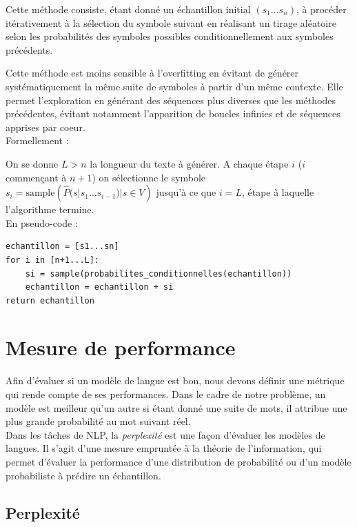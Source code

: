 Cette méthode consiste, étant donné un échantillon initial $(s_1\ldots s_n)$, à procéder itérativement à la sélection du symbole suivant en réalisant un tirage aléatoire selon les probabilités des symboles possibles conditionnellement aux symboles précédents.

Cette méthode est moins sensible à l'overfitting en évitant de générer systématiquement la même suite de symboles à partir d'un même contexte. Elle permet l'exploration en générant des séquences plus diverses que les méthodes précédentes, évitant notamment l'apparition de boucles infinies et de séquences apprises par coeur. \\

Formellement :

On se donne $L>n$ la longueur du texte à générer.
A chaque étape $i$ ($i$ commençant à $n+1$) on sélectionne le symbole $s_i = \text{sample}({\widehat{P}(s|s_1\ldots s_{i-1}) | s \in V})$ jusqu'à ce que $i=L$, étape à laquelle l'algorithme termine. \\

En pseudo-code :

\begin{verbatim}
echantillon = [s1...sn]
for i in [n+1...L]:
    si = sample(probabilites_conditionnelles(echantillon))
    echantillon = echantillon + si
return echantillon
\end{verbatim}

\section{Mesure de performance}

Afin d’évaluer si un modèle de langue est bon, nous devons définir une métrique qui rende
compte de ses performances.
Dans le cadre de notre problème, un modèle est meilleur qu’un autre si étant donné une
suite de mots, il attribue une plus grande probabilité au mot suivant réel.  \\

Dans les tâches de NLP, la \textit{perplexité} est une façon d’évaluer les modèles de langues.
Il s'agit d'une mesure empruntée à la théorie de l'information, qui permet d'évaluer la
performance d'une distribution de probabilité ou d'un modèle probabiliste à prédire un échantillon.

\subsection{Perplexité}


